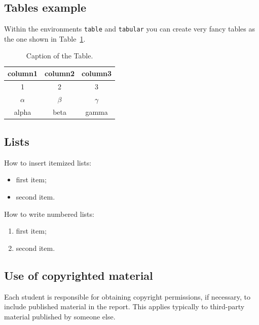 \documentclass[11pt,a4paper]{article}
\begin{document}
\subsection{Tables example}
\label{subsec:tables}
Within the environments \texttt{table} and  \texttt{tabular} you can create very fancy tables as the one shown in Table~\ref{table:example}.
\begin{table}
    \caption{Caption of the Table.}
    \centering 
    \begin{tabular}{c c c }
    \toprule
    column1 & column2 & column3\\
    \midrule
    1 & 2 & 3 \\
    $\alpha$ & $\beta$ & $\gamma$ \\
    alpha & beta & gamma \\
    \bottomrule
    \end{tabular}
    \label{table:example}
\end{table}

\subsection{Lists}
How to insert itemized lists:
\begin{itemize}
    \item first item;
    \item second item.
\end{itemize}
How to write numbered lists:
\begin{enumerate}
    \item first item;
    \item second item.
\end{enumerate}

\vspace{0.3cm} %

\subsection{Use of copyrighted material}
Each student is responsible for obtaining copyright permissions, if necessary, to include published material in the report.
This applies typically to third-party material published by someone else.
\end{document}
